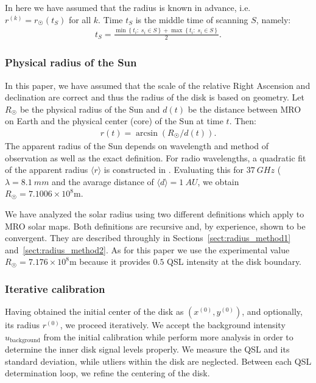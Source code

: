 \documentclass{aa}
\newcommand{\eqnl}[2]{\begin{eqnarray}\label{#1}#2\end{eqnarray}}
\newcommand{\ave}[1]{\langle #1 \rangle}
\renewcommand{\min}[1]{\operatorname{min} \left\{ #1 \right\}}
\renewcommand{\max}[1]{\operatorname{max} \left\{ #1 \right\}}
\newcommand{\s}[2]{{#1}_{\mathrm{#2}}}
\begin{document}
  In here we have assumed that the radius is known in advance, i.e. $r^{(k)} = r_{\astrosun}(t_S)$ for all $k$. Time $t_S$ is the middle time of scanning $S$, namely:
  \eqnl{initial_radius_time}{
  t_S = \frac{\min{t_i :\; s_i \in S} + \max{ t_i :\; s_i \in S}}{2} \text{.}
  }

  \subsubsection{Physical radius of the Sun}\label{sect:physical_radius}
  
  In this paper, we have assumed that the scale of the relative Right Ascension and declination are correct and thus the 
  radius of the disk is based on geometry. Let $R_{\astrosun}$ be the physical radius of the Sun and $d(t)$ be the distance 
  between MRO on Earth and the physical center (core) of the Sun at time $t$. Then:
  \eqnl{visual_angle}{
  r(t) = \arcsin \left( R_{\astrosun} / d(t) \right) \text{.}
  }
  The apparent radius of the Sun depends on wavelength and method of observation as well as the exact definition. For radio wavelengths, a quadratic fit 
  of the apparent radius $\ave r$ is constructed in \cite{Rozelot15}. Evaluating this for $\SI{37}{GHz}$ ($\lambda = 
  \SI{8.1}{mm}$ and the avarage distance of $\ave d = \SI{1}{AU}$, we obtain $R_{\astrosun} = 7.1006 \times 10^8 
  \mathrm{m}$.

  We have analyzed the solar radius using two different definitions which apply to MRO solar maps. Both definitions are 
  recursive and, by experience, shown to be convergent. They are described throughly in 
  Sections~\ref{sect:radius_method1} and~\ref{sect:radius_method2}. As for this paper we use the experimental value 
  $R_{\astrosun} = 7.176 \times 10^8 \mathrm{m}$ because it provides $0.5$ QSL intensity at the disk boundary.

  \subsubsection{Iterative calibration} \label{sect:further_optimization}

  Having obtained the initial center of the disk as $(x^{(0)}, y^{(0)})$, and optionally, its radius $r^{(0)}$, we 
  proceed iteratively. We accept the background intensity $\s{u}{background}$ from the initial calibration while perform more analysis in order to determine the inner disk signal levels properly. We measure the QSL and its standard deviation, while utliers within the disk are neglected. Between each QSL determination loop, we refine the centering of the disk.
\end{document}
